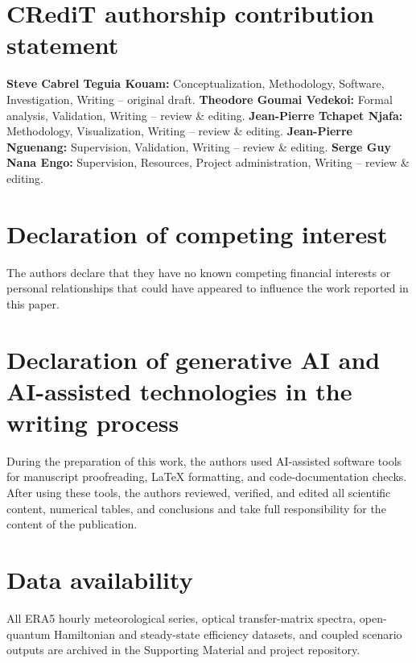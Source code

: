 \documentclass[preprint,12pt,a4paper]{elsarticle}
\begin{document}
\section*{CRediT authorship contribution statement}
\textbf{Steve Cabrel Teguia Kouam:} Conceptualization, Methodology, Software, Investigation, Writing -- original draft. \textbf{Theodore Goumai Vedekoi:} Formal analysis, Validation, Writing -- review \& editing. \textbf{Jean-Pierre Tchapet Njafa:} Methodology, Visualization, Writing -- review \& editing. \textbf{Jean-Pierre Nguenang:} Supervision, Validation, Writing -- review \& editing. \textbf{Serge Guy Nana Engo:} Supervision, Resources, Project administration, Writing -- review \& editing.

\section*{Declaration of competing interest}
The authors declare that they have no known competing financial interests or personal relationships that could have appeared to influence the work reported in this paper.

\section*{Declaration of generative AI and AI-assisted technologies in the writing process}
During the preparation of this work, the authors used AI-assisted software tools for manuscript proofreading, LaTeX formatting, and code-documentation checks. After using these tools, the authors reviewed, verified, and edited all scientific content, numerical tables, and conclusions and take full responsibility for the content of the publication.

\section*{Data availability}
All ERA5 hourly meteorological series, optical transfer-matrix spectra, open-quantum Hamiltonian and steady-state efficiency datasets, and coupled scenario outputs are archived in the Supporting Material and project repository.



\end{document}

